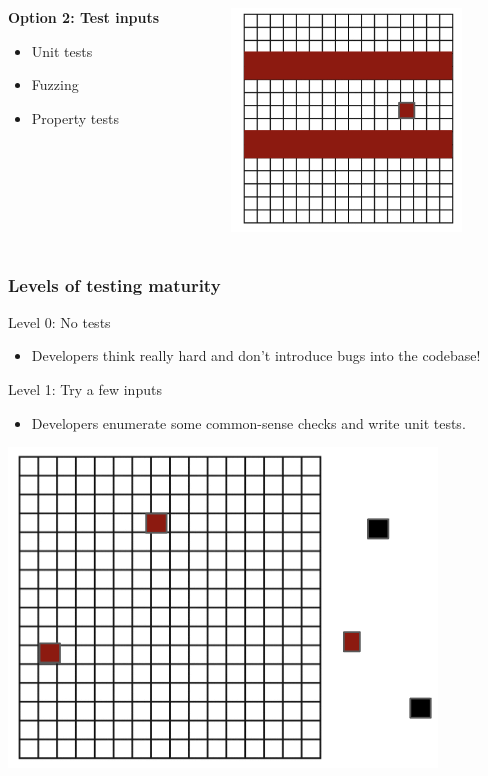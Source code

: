 \documentclass{beamer}
\begin{document}
\begin{frame}
\pause
	\vspace{.5\baselineskip}

	\begin{columns}[onlytextwidth]
		\begin{column}{.5\textwidth}
	\textbf{Option 2: Test inputs} \begin{itemize}
		\item{Unit tests}
		\item{Fuzzing}
		\item{Property tests}
	\end{itemize}
		\end{column}
		\begin{column}{.5\textwidth}
			\centering \includegraphics[scale=.5]{tested}
		\end{column}
	\end{columns}

\end{frame}

\begin{frame}
	\frametitle{Levels of testing maturity}
	
Level 0: No tests
	\begin{itemize}
		\item{Developers think really hard and don't introduce bugs into the codebase!}
	\end{itemize}

\vspace{\baselineskip}

Level 1: Try a few inputs
	\begin{itemize}
		\item{Developers enumerate some common-sense checks and write unit tests.}
	\end{itemize}

	\centering \includegraphics[scale=.5]{phase1}
\end{frame}
\end{document}
